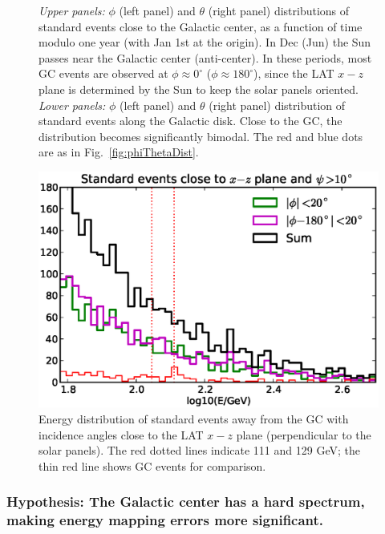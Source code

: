 \documentclass[aps,twocolumn,prd,superscriptaddress,showpacs,nofootinbib,fixfloat]{revtex4}
\newcommand{\degree}{^{\rm o}}
\begin{document}
\begin{figure}
  \caption{\emph{Upper panels:} $\phi$ (left panel) and
  $\theta$ (right panel) distributions of standard events
  close to the Galactic center, as a function of time modulo
  one year (with Jan 1st at the origin). In Dec (Jun) the
  Sun passes near the Galactic center (anti-center).  In
  these periods, most GC events are observed at $\phi\approx
  0^\circ$ ($\phi\approx 180^\circ$), since the LAT $x-z$
  plane is determined by the Sun to keep the solar panels
  oriented. \emph{Lower panels:} $\phi$ (left panel) and
  $\theta$ (right panel) distribution of standard events
  along the Galactic disk. Close to the GC, the distribution
  becomes significantly bimodal. The red and blue dots are
  as in Fig.~\ref{fig:phiThetaDist}.}
  \label{fig:time_phi}
\end{figure}

\begin{figure}
  \centering
  \includegraphics[width=1.0\linewidth]{plots/phi_energy.eps}
  \caption{Energy distribution of standard events away from the GC with
  incidence angles close to the LAT $x-z$ plane (perpendicular to the solar
  panels). The red dotted lines indicate 111 and 129 GeV; the thin red line
  shows GC events for comparison.}
  \label{fig:spectrum_phi}
\end{figure}

\subsubsection{Hypothesis: The Galactic
center has a hard spectrum, making energy mapping errors more
significant.}
\end{document}
